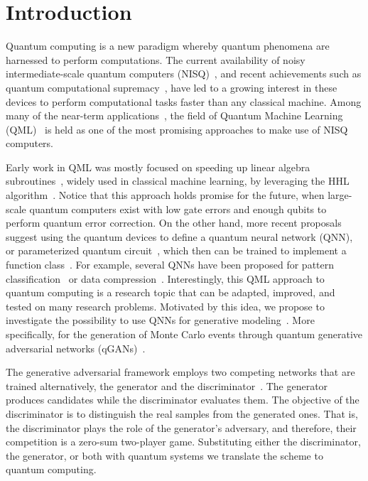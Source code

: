 \documentclass[twocolumn,preprintnumbers,superscriptaddress]{revtex4-2}
\begin{document}
\section{Introduction}

Quantum computing is a new paradigm whereby quantum phenomena are harnessed to
perform computations. The current availability of noisy intermediate-scale
quantum computers (NISQ)~\cite{nisq}, and recent achievements such as quantum
computational supremacy~\cite{supremacy, zhong2020quantum}, have led to a
growing interest in these devices to perform computational tasks faster than any
classical machine. Among many of the near-term
applications~\cite{cerezo2021variational, bharti2021noisy}, the field of Quantum
Machine Learning (QML)~\cite{biamonte2017quantum, schuld2018supervised} is held
as one of the most promising approaches to make use of NISQ computers.

Early work in QML was mostly focused on speeding up linear algebra
subroutines~\cite{wiebe2012quantum, lloyd:2013ml, Rebentrost:2014svm,
  kerenidis2020quantum}, widely used in classical machine learning, by leveraging
the HHL algorithm~\cite{harrow2009quantum}. Notice that this approach holds
promise for the future, when large-scale quantum computers exist with low gate
errors and enough qubits to perform quantum error correction. On the other hand, more
recent proposals suggest using the quantum devices to define a quantum neural network (QNN), or parameterized
quantum circuit~\cite{benedetti2019parameterized, sim2019expressibility,
  bravo2020scaling}, which then can be trained to
implement a function class~\cite{schuld2021effect, goto2021universal,
  perez2021one}. For example, several QNNs have been proposed for pattern
classification~\cite{havlivcek2019supervised, Schuld:2020circuit,
  perezsalinas:2020reuploading} or data compression~\cite{romero2017quantum,
  bravo2021quantum, cao2021noise}. Interestingly, this QML approach to quantum
computing is a research topic that can be adapted, improved, and tested on many
research problems. Motivated by this idea, we propose to investigate the
possibility to use QNNs for generative modeling~\cite{benedetti2019generative,
  hamilton2019generative, coyle2020born}. More specifically, for the generation of
Monte Carlo events through quantum generative adversarial networks
(qGANs)~\cite{dallaire2018quantum, lloyd2018quantum}.

The generative adversarial framework employs two competing networks that are
trained alternatively, the generator and the
discriminator~\cite{goodfellow2014generative}. The generator produces candidates
while the discriminator evaluates them. The objective of the discriminator is to
distinguish the real samples from the generated ones. That is, the discriminator
plays the role of the generator's adversary, and therefore, their competition is
a zero-sum two-player game. Substituting either the discriminator, the
generator, or both with quantum systems we translate the scheme to quantum
computing.
\end{document}
